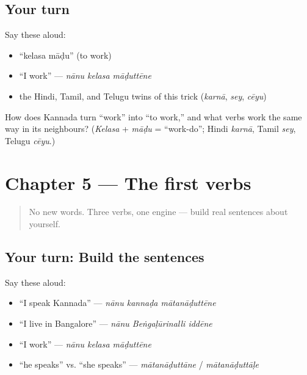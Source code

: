 \subsection*{Your turn}
Say these aloud:

\begin{itemize}
\raggedright
  \item \textquotedblleft{}kelasa māḍu\textquotedblright{} (to work)
  \item \textquotedblleft{}I work\textquotedblright{} — \emph{nānu kelasa māḍuttēne}
  \item the Hindi, Tamil, and Telugu twins of this trick (\emph{karnā}, \emph{sey}, \emph{cēyu})
\end{itemize}

\begin{tcolorbox}[breakable,colback=teal!4,colframe=teal!35!black,title={Before you move on}]
How does Kannada turn \textquotedblleft{}work\textquotedblright{} into \textquotedblleft{}to work,\textquotedblright{} and what verbs work the same way in its neighbours? (\emph{Kelasa} + \emph{māḍu} = \textquotedblleft{}work-do\textquotedblright{}; Hindi \emph{karnā}, Tamil \emph{sey}, Telugu \emph{cēyu}.)
\end{tcolorbox}
\section[Practice]{Chapter 5 — The first verbs}

\label{lesson:KA-C05-practice}



\begin{quote}
No new words. Three verbs, one engine — build real sentences about yourself.
\end{quote}

\subsection*{Your turn: Build the sentences}
Say these aloud:

\begin{itemize}
\raggedright
  \item \textquotedblleft{}I speak Kannada\textquotedblright{} — \emph{nānu kannaḍa mātanāḍuttēne}
  \item \textquotedblleft{}I live in Bangalore\textquotedblright{} — \emph{nānu Beṅgaḷūrinalli iddēne}
  \item \textquotedblleft{}I work\textquotedblright{} — \emph{nānu kelasa māḍuttēne}
  \item \textquotedblleft{}he speaks\textquotedblright{} vs. \textquotedblleft{}she speaks\textquotedblright{} — \emph{mātanāḍuttāne} / \emph{mātanāḍuttāḷe}
\end{itemize}

